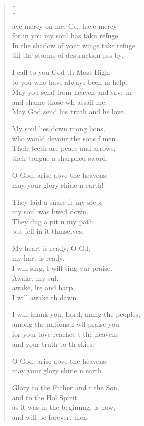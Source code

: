 \settowidth{\versewidth}{I will thank you, Lord, among the peoples, *}
\begin{verse}[\versewidth]
  \begin{patverse}
    ave mercy on me, Gd, have mercy\Med\\
for in you my soul has takn refuge.\\
In the shadow of your wings  take refuge\Med\\
till the storms of destruction pss by.

I call to you God th Most High,\Med\\
to you who have always been m help.\\
May you send from heaven and save m\Flex\\
and shame those wh assail me.\Med\\
May God send his truth and h\pointup{\i}s love.

My soul lies down mong lions,\Med\\
who would devour the sons f men.\\
Their teeth are pears and arrows,\Med\\
their tongue a sharpned sword.

O God, arise abve the heavens;\Med\\
may your glory shine n earth!

They laid a snare fr my steps\Med\\
my soul was bwed down.\\
They dug a pit \pointup{\i}n my path\Med\\
but fell in it thmselves.

My heart is ready, O Gd,\Flex\\
my hart is ready.\Med\\
I will sing, I will sing yur praise.\\
Awake, my sul;\Flex\\
awake, lre and harp,\Med\\
I will awake th dawn.

I will thank you, Lord, amng the peoples,\Med\\
among the nations I w\pointup{\i}ll praise you\\
for your love reaches t the heavens\Med\\
and your truth to th skies.

O God, arise abve the heavens;\Med\\
may your glory shine n earth.

Glory to the Father and t the Son,\Med\\
and to the Hol Spirit:\\
as it was in the beginn\pointup{\i}ng, is now,\Med\\
and will be forever. men. 
  \end{patverse}
\end{verse}
